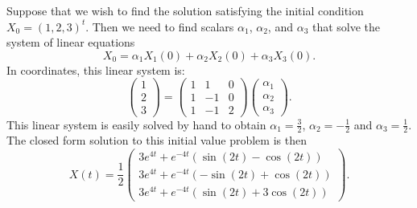 Suppose that we wish to find the solution satisfying the initial 
condition $X_0=(1,2,3)^t$.  Then we need 
to find scalars $\alpha_1$,
$\alpha_2$, and $\alpha_3$ that solve the system of linear equations
\[
X_0 = \alpha_1X_1(0) + \alpha_2X_2(0) + \alpha_3X_3(0).
\]
In coordinates, this linear system is:
\[
\left(\begin{array}{c} 1 \\ 2 \\ 3\end{array}\right) =
\left(\begin{array}{rrr} 1 & 1 & 0 \\ 1 & -1 & 0 \\ 1 & -1 & 2 \end{array}
\right)\left(\begin{array}{c} \alpha_1 \\ \alpha_2 \\ \alpha_3
\end{array}\right).
\] 
This linear system is easily solved by hand to obtain 
$\alpha_1=\frac{3}{2}$, $\alpha_2=-\frac{1}{2}$ and $\alpha_3=\frac{1}{2}$.
The closed form solution to this initial value problem is then 
\begin{equation}  \label{E:ecp}
X(t) = \frac{1}{2}\left(\begin{array}{c} 
3e^{4t} + e^{-4t}(\sin(2t)-\cos(2t)) \\
3e^{4t} + e^{-4t}(-\sin(2t)+\cos(2t))\\
3e^{4t} + e^{-4t}(\sin(2t)+3\cos(2t))
\end{array}\right).
\end{equation}


